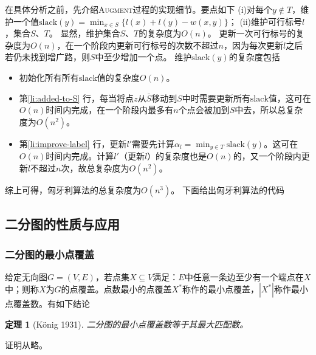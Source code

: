 \documentclass[a4paper]{ctexbook}
\newtheorem{theorem}{定理}[chapter] %
\newcommand{\slack}{\mathrm{slack}}
\begin{document}
  在具体分析之前，先介绍\textsc{Augment}过程的实现细节。要点如下
  (i)对每个$y\notin T$，维护一个值$\slack(y)=\min_{x\in S}\{l(x)+l(y)-w(x,y)\}$；
  (ii)维护可行标号$l$，集合$S$、$T$。
  显然，维护集合$S$、$T$的复杂度为$O(n)$。
  更新一次可行标号的复杂度为$O(n)$，在一个阶段内更新可行标号的次数不超过$n$，因为每次更新$l$之后若仍未找到增广路，则$S$中至少增加一个点。
  维护$\slack(y)$的复杂度包括
  \begin{itemize}
    \item 初始化所有所有$\slack$值的复杂度$O(n)$。
    \item 第\ref{li:added-to-S} 行，每当将点$z$从$\bar{S}$移动到$S$中时需要更新所有$\slack$值，这可在$O(n)$时间内完成，在一个阶段内最多有$n$个点会被加到$S$中去，所以总复杂度为$O(n^2)$。
    \item 第\ref{li:improve-label} 行，更新$l'$需要先计算$\alpha_l=\min_{y\in T}\slack(y)$。这可在$O(n)$时间内完成。计算$l'$（更新$l$）的复杂度也是$O(n)$的，又一个阶段内更新$l$不超过$n$次，故总复杂度为$O(n^2)$。
  \end{itemize}
  综上可得，匈牙利算法的总复杂度为$O(n^3)$。
  下面给出匈牙利算法的代码
  
  \subsection{二分图的性质与应用}
  \subsubsection*{二分图的最小点覆盖}
  给定无向图$G=(V,E)$，若点集$X\subseteq V$满足：$E$中任意一条边至少有一个端点在$X$中；则称$X$为$G$的点覆盖。点数最小的点覆盖$X^*$称作的最小点覆盖，$|X^*|$称作最小点覆盖数。有如下结论
  \begin{theorem}[K\"{o}nig 1931]
    二分图的最小点覆盖数等于其最大匹配数。
  \end{theorem}
  证明从略。
\end{document}
